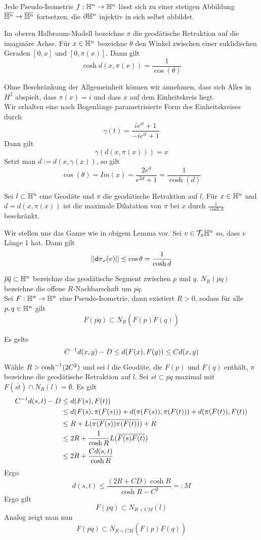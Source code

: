 \documentclass{book}
\renewcommand{\d}{\textsf{d}}
\begin{document}
\Satz{}
Jede Pseudo-Isometrie $f : \mathbb{H}^n \overset{}{\rightarrow} \mathbb{H}^n$ lässt sich zu einer stetigen Abbildung $ \overline{\mathbb{H}^n} \overset{}{\rightarrow} \overline{\mathbb{H}^n}$ fortsetzen, die $\partial \mathbb{H}^n$ injektiv in sich selbst abbildet.

\Lem{}
Im oberen Halbraum-Modell bezeichne $\pi$ die geodätische Retraktion auf die imaginäre Achse. Für $x\in \mathbb{H}^n$ bezeichne $\theta$ den Winkel zwischen einer euklidischen Geraden $[0,x]$ und $[0,\pi(x)]$. Dann gilt
\[ \cosh d(x,\pi(x)) = \frac{1}{\cos (\theta)} \]
\begin{Beweis}{}
	Ohne Beschränkung der Allgemeinheit können wir annehmen, dass sich Alles in $H^2$ abspielt, dass $\pi(x) = i$ und dass $x$ auf dem Einheitskreis liegt.\\
	Wir erhalten eine nach Bogenlänge parametrisierte Form des Einheitskreises durch
	\[ \gamma(t) = \frac{ie^{it} + 1}{-ie^{it} + 1} \]
	Dann gilt
	\[ \gamma(d(x,\pi(x))) = x \]
	Setzt man $d := d(x,\gamma(x))$, so gilt
	\[ \cos(\theta) = Im(x) = \frac{2e^d}{e^{2d} + 1} = \frac{1}{\cosh(d)} \]
\end{Beweis}

\Lem{}
Sei $l \subset \mathbb{H}^n$ eine Geodäte und $\pi$ die geodätische Retraktion auf $l$. Für $x \in \mathbb{H}^n$ und $d = d(x,\pi(x))$ ist die maximale Dilatation von $\pi$ bei $x$ durch $\frac{1}{\cosh d}$ beschränkt.
\begin{Beweis}{}
	Wir stellen uns das Ganze wie in obigem Lemma vor. Sei $v \in \mathcal{T}_x\mathbb{H}^n$ so, dass $v$ Länge 1 hat. Dann gilt
	\[ \norm{\d\pi_x(v)} \leq  \cos \theta = \frac{1}{\cosh d} \] 
\end{Beweis}

\Lem{}
$\overline{pq}\subset \mathbb{H}^n$ bezeichne das geodätische Segment zwischen $p$ und $q$. $N_R(\overline{pq})$ bezeichne die offene $R$-Nachbarschaft um $\overline{pq}$.\\
Sei $F : \mathbb{H}^n \overset{}{\rightarrow} \mathbb{H}^n$ eine Pseudo-Isometrie, dann existiert $R> 0$, sodass für alle $p,q \in \mathbb{H}^n$ gilt
\[ F(\overline{pq}) \subset N_R(\overline{F(p)F(q)}) \]
\begin{Beweis}{}
	Es gelte
	\[ C^{-1} d(x, y) - D \leq d(F(x),F(y)) \leq Cd(x,y) \]
	Wähle $R > \cosh^{-1} (2C^2)$ und sei $l$ die Geodäte, die $F(p)$ und $F(q)$ enthält, $\pi$ bezeichne die geodätische Retraktion auf $l$. Sei $\overline{st} \subset \overline{pq}$ maximal mit $F(\overline{st})\cap N_R(l) = \emptyset$. Es gilt
	\begin{align*}
	C^{-1} d(s, t) - D &\leq d(F(s), F(t)) \\
	&\leq d(F(s), \pi (F(s)) ) + d(\pi(F(s) ), \pi (F (t) ) )+ d(\pi(F(t) ), F (t)  )\\
	&\leq R + L( \overline{ \pi(F(s) ) \pi (F (t) )  } )+ R\\
	& \leq 2R + \frac{1}{\cosh R} L(\overline{ F(s)F(t) })\\
	& \leq 2R + \frac{ C d(s,t) }{\cosh R}
	\end{align*}
	Ergo
	\[ d(s,t) \leq \frac{ (2R + CD) \cosh R }{ \cosh R - C^2 } =: M \]
	Ergo gilt
	\[ F(\overline{pq}) \subset N_{R + C M} (l) \]
	Analog zeigt man nun
	\[ F(\overline{pq}) \subset N_{R + C M} (\overline{F(p)F(q)}) \]
\end{Beweis}
\end{document}
